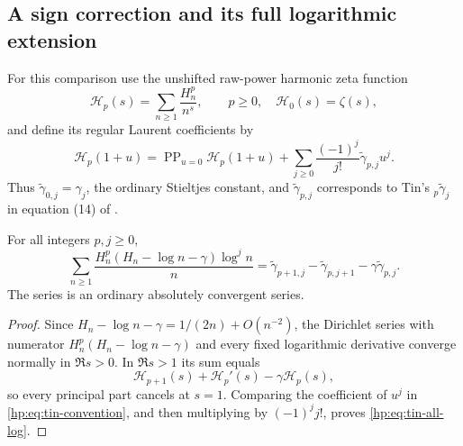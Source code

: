 \subsection{A sign correction and its full logarithmic extension}
\label{hp:sec:tin-audit}

For this comparison use the unshifted raw-power harmonic zeta function
\[
 \mathcal H_p(s)=\sum_{n\ge1}\frac{H_n^p}{n^s},\qquad p\ge0,
 \quad \mathcal H_0(s)=\zeta(s),
\]
and define its regular Laurent coefficients by
\begin{equation}\label{hp:eq:tin-convention}
 \mathcal H_p(1+u)=\operatorname{PP}_{u=0}\mathcal H_p(1+u)
       +\sum_{j\ge0}\frac{(-1)^j}{j!}
                         \widetilde\gamma_{p,j}u^j.
\end{equation}
Thus $\widetilde\gamma_{0,j}=\gamma_j$, the ordinary Stieltjes
constant, and $\widetilde\gamma_{p,j}$ corresponds to Tin's
${}_p\widetilde\gamma_j$ in equation (14) of
\cite{hp:Tin2025}.

\begin{proposition}
\label{hp:prop:tin-all-log}
For all integers $p,j\ge0$,
\begin{equation}\label{hp:eq:tin-all-log}
 \boxed{\quad
 \sum_{n\ge1}\frac{H_n^p(H_n-\log n-\gamma)\log^j n}{n}
   =\widetilde\gamma_{p+1,j}
        -\widetilde\gamma_{p,j+1}
        -\gamma\widetilde\gamma_{p,j}.\quad}
\end{equation}
The series is an ordinary absolutely convergent series.
\end{proposition}
\begin{proof}
Since $H_n-\log n-\gamma=1/(2n)+O(n^{-2})$, the Dirichlet
series with numerator $H_n^p(H_n-\log n-\gamma)$ and every fixed
logarithmic derivative converge normally in $\Re s>0$. In $\Re s>1$
its sum equals
\[
 \mathcal H_{p+1}(s)+\mathcal H_p'(s)-\gamma\mathcal H_p(s),
\]
so every principal part cancels at $s=1$. Comparing the coefficient
of $u^j$ in \eqref{hp:eq:tin-convention}, and then multiplying by
$(-1)^j j!$, proves \eqref{hp:eq:tin-all-log}.
\end{proof}


